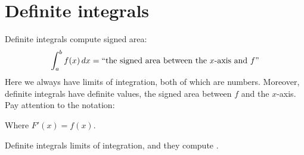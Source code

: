 \documentclass{ximera}
\begin{document}
\section{Definite integrals}

Definite integrals compute signed area:
\[
\int_a^b f(x) \,d x = \text{``the signed area between the $x$-axis and $f$''}
\]
Here we always have limits of integration, both of which are
numbers. Moreover, definite integrals have definite values, the signed
area between $f$ and the $x$-axis. Pay attention to the notation:
\begin{center}
\end{center}
Where $F'(x) = f(x)$.
\begin{explanation}%
  Definite integrals  limits of integration, and they compute
  .
\end{explanation}
\end{document}
